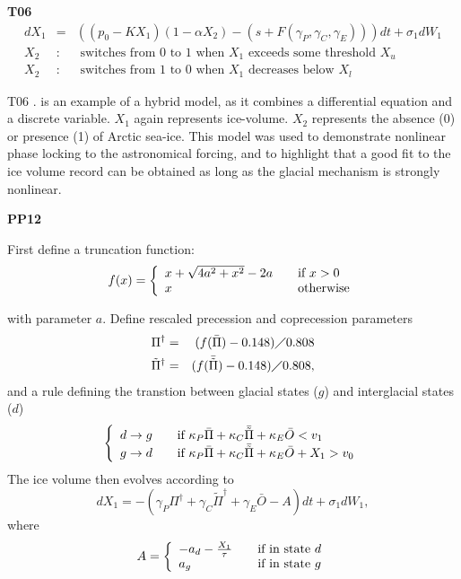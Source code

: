 \documentclass[a4paper,12pt]{article}
\begin{document}
\vspace{0.5cm}

{\bf T06}
\begin{eqnarray*}
dX_1 & = & \left( \left(p_0 - K X_1 \right) \left(1 - \alpha X_2 \right) - \left(s + F(\gamma_P,\gamma_C,\gamma_E) \right) \right) dt + \sigma_1 dW_1 \\
X_2 & : & \mbox{ switches from } 0 \mbox{ to } 1 \mbox{              when $X_1$ exceeds some threshold $X_u$} \\
X_2 & : & \mbox{ switches from } 1 \mbox{ to } 0 \mbox{              when $X_1$ decreases below $X_l$}
\end{eqnarray*}

T06 \cite{Tziperman2006}.
is an example of a hybrid model, as it combines a differential equation and a discrete variable.
$X_1$ again represents ice-volume.
$X_2$ represents the absence (0) or presence (1) of Arctic sea-ice.
This model was used to demonstrate nonlinear phase locking to the astronomical forcing, and to highlight that a good fit to the ice volume record can be obtained as long as the glacial mechanism is strongly nonlinear.


\vspace{0.5cm}

{\bf PP12}



\vspace{12pt}
First define a truncation function:
\[ f(x) = \left\{
  \begin{array}{l l}
    x + \sqrt{4a^2 + x^2} - 2a & \quad \text{if $x > 0$}\\
    x & \quad \text{otherwise}
  \end{array} \right.\]

\noindent with parameter $a$.
Define rescaled precession and coprecession parameters
\begin{eqnarray*}
\Pi^{\dag} & = & (f(\bar{\Pi}) - 0.148) \diagup 0.808 \\
\tilde{\Pi}^{\dag} & = & (f(\bar{\tilde{\Pi}}) - 0.148) \diagup 0.808,
\end{eqnarray*}
\noindent and a rule defining the transtion between glacial states ($g$) and interglacial states ($d$)
\[ \left\{
  \begin{array}{l l}
    d \rightarrow g & \quad \text{if $\kappa_P \bar{\Pi} + \kappa_C \bar{\tilde{\Pi}} + \kappa_E \bar{O} < v_1$}\\
    g \rightarrow d & \quad \text{if $\kappa_P \bar{\Pi} + \kappa_C \bar{\tilde{\Pi}} + \kappa_E \bar{O} + X_1 > v_0$}
  \end{array} \right.\]
\noindent The ice volume then evolves according to
\[ dX_1 = -(\gamma_P \Pi^{\dag} + \gamma_C \tilde{\Pi}^{\dag} + \gamma_E \bar{O} - A)dt + \sigma_1 dW_1, \]
\noindent where
\[ A = \left\{
  \begin{array}{l l}
    - a_d - \frac{X_1}{\tau} & \quad \text{if in state $d$}\\
    a_g & \quad \text{if in state $g$}
  \end{array} \right.\]
\end{document}
